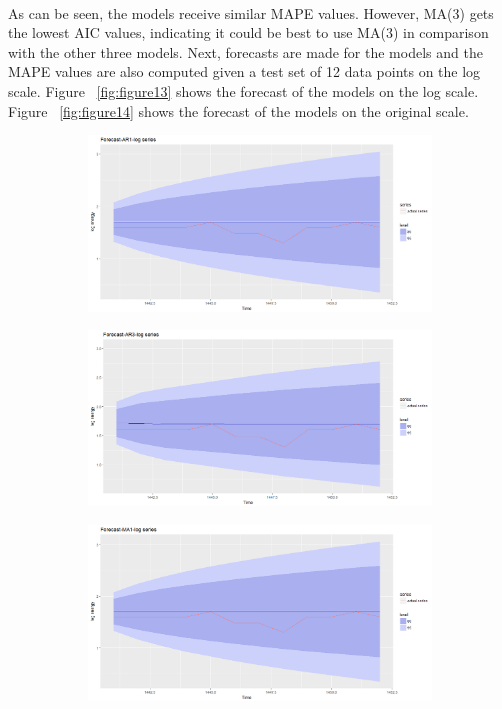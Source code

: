 \documentclass[12pt]{article}
\begin{document}
\paragraph{}
As can be seen, the models receive similar MAPE values. However, MA(3) gets the lowest AIC values, indicating it could be best to use MA(3) in comparison with the other three models. Next, forecasts are made for the models and the MAPE values are also computed given a test set of 12 data points on the log scale. Figure ~\ref{fig:figure13}  shows the forecast of the models on the log scale. Figure ~\ref{fig:figure14}  shows the forecast of the models on the original scale.
\begin{figure}[H]
  \centering
  \begin{subfigure}[b]{0.6\linewidth}
    \includegraphics[width=\linewidth]{figure13-1.png}
  \end{subfigure}
  \begin{subfigure}[b]{0.6\linewidth}
    \includegraphics[width=\linewidth]{figure13-2.png}
  \end{subfigure}
  \begin{subfigure}[b]{0.6\linewidth}
    \includegraphics[width=\linewidth]{figure13-3.png}

\end{subfigure}
\end{figure}
\end{document}

